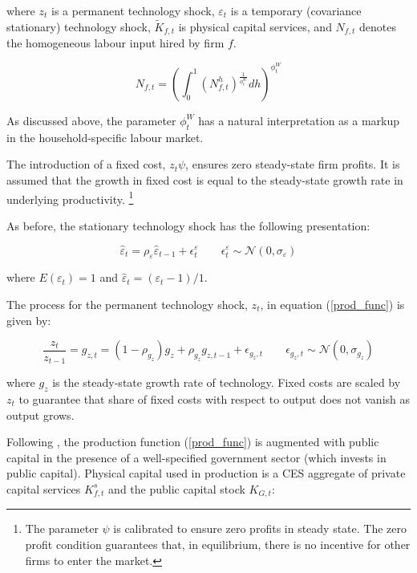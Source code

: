 \documentclass[a4paper,11pt]{article}
\numberwithin{equation}{section}
\begin{document}
	where $z_t$ is a permanent technology shock, $\varepsilon_t$ is a temporary (covariance stationary) technology shock, $\tilde{K}_{f,t}$ is physical capital services, and $N_{f,t}$ denotes the homogeneous labour input hired by firm $f$.
	
	\begin{equation} \label{agg_lab}
	N_{f,t}=\left(\int_{0}^{1}\left(N^h_{f,t}\right)^{\frac{1}{\phi^W_t}}dh\right)^{\phi^W_t}
	\end{equation}
	
	As discussed above, the parameter $\phi^W_t$ has a natural interpretation as a markup in the household-specific labour market.
	
	The introduction of a fixed cost, $z_t \psi$, ensures zero steady-state firm profits. It is assumed that the growth in fixed cost is equal to the steady-state growth rate in underlying productivity. \footnote{The parameter $\psi$ is calibrated to ensure zero profits in steady state. The zero profit condition guarantees that, in equilibrium, there is no incentive for other firms to enter the market.}
	
	As before, the stationary technology shock has the following presentation: 
	
	\begin{equation} \label{vareps}
	\hat{\varepsilon}_t=\rho_\varepsilon \hat{\varepsilon}_{t-1}+\epsilon^\varepsilon_t \qquad \epsilon^\varepsilon_t \sim \mathcal{N}(0,\sigma_\varepsilon)
	\end{equation}
	
	where $E\left(\varepsilon_t\right)=1$ and $\hat{\varepsilon}_t=\left(\varepsilon_t-1\right)/1$. 
	
	The process for the permanent technology shock, $z_t$, in equation (\ref{prod_func}) is given by:
	
	\begin{equation} \label{g}
	\frac{z_t}{z_{t-1}}=g_{z,t}=\left(1-\rho_{g_z}\right)g_z+\rho_{g_z}g_{z,t-1}+\epsilon_{g_z,t} \qquad \epsilon_{g_z,t} \sim \mathcal{N}(0,\sigma_{g_z})
	\end{equation} 
	
	where $g_z$ is the steady-state growth rate of technology. Fixed costs are scaled by $z_t$ to guarantee that share of fixed costs with respect to output does not vanish as output grows.
	
	Following \cite{coenen2013}, the production function (\ref{prod_func}) is augmented with public capital in the presence of a well-specified government sector (which invests in public capital). Physical capital used in production is a CES aggregate of private capital services $K_{f,t}^s$ and the public capital stock $K_{G,t}$:
	
\end{document}
